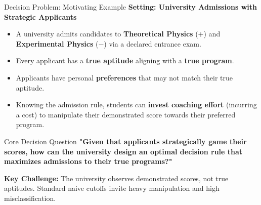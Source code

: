 \documentclass[aspectratio=169, 11pt, t, xcolor=table]{beamer}
\begin{document}
\begin{frame}{Decision Problem: Motivating Example}
\small
\textbf{Setting: University Admissions with Strategic Applicants}
\begin{itemize}\itemsep=1pt
  \item A university admits candidates to \textbf{Theoretical Physics} ($+$) and \textbf{Experimental Physics} ($-$) via a declared entrance exam.
  \item Every applicant has a \textbf{true aptitude} aligning with a \textbf{true program}.
  \item Applicants have personal \textbf{preferences} that may not match their true aptitude.
  \item Knowing the admission rule, students can \textbf{invest coaching effort} (incurring a cost) to manipulate their demonstrated score towards their preferred program.
\end{itemize}

\par\vspace{0.3em}
\begin{alertblock}{Core Decision Question}
\centering\small
\textbf{"Given that applicants strategically game their scores, how can the university design an optimal decision rule that maximizes admissions to their true programs?"}
\end{alertblock}

\par\vspace{0.2em}
{\footnotesize \textbf{Key Challenge:} The university observes demonstrated scores, not true aptitudes. Standard naive cutoffs invite heavy manipulation and high misclassification.}
\end{frame}
\end{document}
